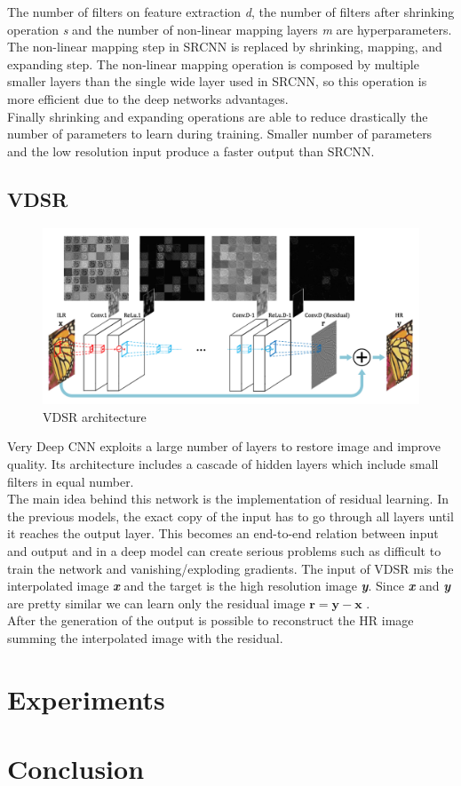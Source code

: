 \documentclass[10pt,twocolumn,letterpaper]{article}
\begin{document}
The number of filters on feature extraction \textit{d}, the number of filters after shrinking operation \textit{s} and the number of non-linear mapping layers \textit{m} are hyperparameters.\\
The non-linear mapping step in SRCNN is replaced by shrinking, mapping, and expanding step.
The non-linear mapping operation is composed by multiple smaller layers than the single wide layer used in SRCNN, so this operation is more efficient due to the deep networks advantages.\\
Finally shrinking and expanding operations are able to reduce drastically the number of parameters to learn during training. Smaller number of parameters and the low resolution input produce a faster output than SRCNN.\\




\subsection{VDSR}
\begin{figure}[]
	\centering
	\includegraphics[width=\textwidth]{img/vdsr.png}
	\caption{VDSR architecture\cite{kim2015accurate}}
	\label{vdsr}
\end{figure}
Very Deep CNN exploits a large number of layers to restore image and improve quality.
Its architecture includes a cascade of hidden layers which include small filters in equal number.\\
The main idea behind this network is the implementation of residual learning. In the previous models, the exact copy of the input has to go through all layers until it reaches the output layer. This becomes an end-to-end relation between input  and output and in a deep model can create serious problems such as difficult to train the network and vanishing/exploding gradients.
The input of VDSR mis the interpolated image \textit{\textbf{x}} and the target is the high resolution image \textit{\textbf{y}}.
Since \textit{\textbf{x}} and \textit{\textbf{y}} are pretty similar we can learn only the residual image $\textbf{r} = \textbf{y} - \textbf{x}$ .\\
After the generation of the output is possible to reconstruct the HR image summing the interpolated image with the residual.





\section{Experiments}

\section{Conclusion}

{\small


}
\end{document}
